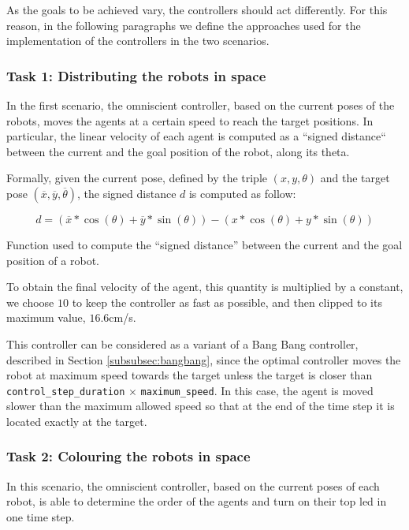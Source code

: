 As the goals to be achieved vary, the controllers should act differently. For this 
reason, in the following paragraphs we define the approaches used for the 
implementation of the controllers in the two scenarios.

\subsubsection{Task 1: Distributing the robots in space}
\label{subsubsec:experttask1}

In the first scenario, the omniscient controller, based on the current poses of the 
robots, moves the agents at a certain speed to reach the target positions. In 
particular, the linear velocity of each agent is computed as a ``signed distance`` 
between the current and the goal position of the robot, along its theta. 

Formally, given the current pose, defined by the triple $(x, y, \theta)$ and the 
target pose $(\overline x, \overline y, \overline \theta)$, the signed distance $d$ 
is computed as follow:
\begin{Equation}[!htb]
	\centering
	\begin{equation}
	d = \left(\overline x * \cos (\theta) + \overline y * \sin (\theta)\right) -
	\left( x * \cos (\theta) + y * \sin (\theta)\right)
	\end{equation}
	\caption[Signed distance function.]{Function used to compute the ``signed 
		distance'' between the current and the goal position of a robot.}
	\label{eq:signeddist}
\end{Equation}

\noindent
To obtain the final velocity of the agent, this quantity is multiplied by a constant, 
we choose $10$ to keep the controller as fast as possible, and then clipped to its 
maximum value, $16.6$\gls{cm/s}.

This controller can be considered as a variant of a Bang Bang controller, described 
in Section \ref{subsubsec:bangbang}, since the optimal controller moves the 
robot at maximum speed towards the target unless the target is closer than 
\texttt{control\_step\_duration} $\times$ \texttt{maximum\_speed}. In this case, 
the agent is moved slower than the maximum allowed speed so that at the end of 
the time step it is located exactly at the target.

\subsubsection{Task 2: Colouring the robots in space}
In this scenario, the omniscient controller, based on the current poses of each 
robot, is able to determine the order of the agents and turn on their top \gls{led}  
in one time step.


